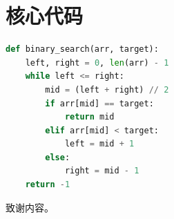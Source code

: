 \documentclass[
    degree=bachelor,
    StudentName=张三,
    StudentID=2020123456,
    AdvisorName=李四,
    Major=计算机科学与技术,
    Department=计算机学院,
    SubmitYear=2024,
    SubmitMonth=6,
    Title=基于某某方法的某课题研究,
    TitleEng={Research on Some Topic Based on Some Method},  %
]{cauc_thesis}
\begin{document}
\chapter{核心代码}

\begin{lstlisting}[language=Python, caption={二分查找实现}]
def binary_search(arr, target):
    left, right = 0, len(arr) - 1
    while left <= right:
        mid = (left + right) // 2
        if arr[mid] == target:
            return mid
        elif arr[mid] < target:
            left = mid + 1
        else:
            right = mid - 1
    return -1
\end{lstlisting}

\backmatter



\begin{acknowledgment}
    致谢内容。
\end{acknowledgment}
\end{document}
